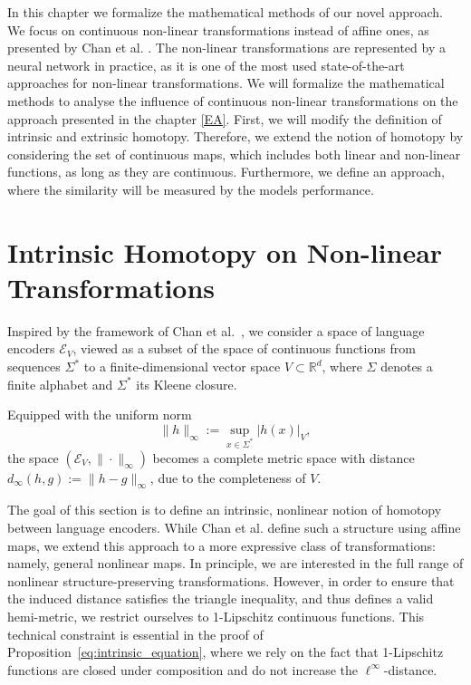 In this chapter we formalize the mathematical methods of our novel approach.
We focus on continuous non-linear transformations instead of affine ones, as presented by Chan et al. \cite{chan_affine_2024}.
The non-linear transformations are represented by a neural network in practice, as it is one of the most used state-of-the-art approaches for non-linear transformations.
We will formalize the mathematical methods to analyse the influence of continuous non-linear transformations on the approach presented in the chapter \ref{EA}.
First, we will modify the definition of intrinsic and extrinsic homotopy. 
Therefore, we extend the notion of homotopy by considering the set of continuous maps, which includes both linear and non-linear functions, as long as they are continuous.
Furthermore, we define an approach, where the similarity will be measured by the models performance. 


\section{Intrinsic Homotopy on Non-linear Transformations}\label{InrinsicHomotopyonNonlinTransf}
Inspired by the framework of Chan et al.~\cite{chan_affine_2024}, we consider a space of language encoders \( \mathcal{E}_V \), viewed as a subset of the space of continuous functions from sequences \( \Sigma^* \) to a finite-dimensional vector space \( V \subset \mathbb{R}^d \), where \( \Sigma \) denotes a finite alphabet and \( \Sigma^* \) its Kleene closure.

Equipped with the uniform norm
\[
\|h\|_\infty := \sup_{x \in \Sigma^*} |h(x)|_V,
\]
the space \( (\mathcal{E}_V, \|\cdot\|_\infty) \) becomes a complete metric space with distance \( d_\infty(h, g) := \|h - g\|_\infty \), due to the completeness of \( V \).

The goal of this section is to define an intrinsic, nonlinear notion of homotopy between language encoders.  
While Chan et al. \cite{chan_affine_2024} define such a structure using affine maps, we extend this approach to a more expressive class of transformations: namely, general nonlinear maps.  
In principle, we are interested in the full range of nonlinear structure-preserving transformations.  
However, in order to ensure that the induced distance satisfies the triangle inequality, and thus defines a valid hemi-metric, we restrict ourselves to 1-Lipschitz continuous functions.  
This technical constraint is essential in the proof of Proposition~\ref{eq:intrinsic_equation}, where we rely on the fact that 1-Lipschitz functions are closed under composition and do not increase the \( \ell^\infty \)-distance.


